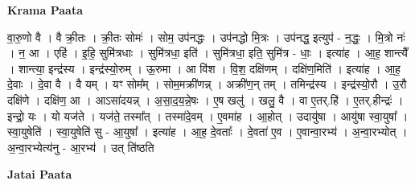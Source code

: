 \documentclass[17pt]{extarticle}
\begin{document}
\textbf{Krama Paata} \newline

वा॒रु॒णो वै । वै क्री॒तः । क्री॒तः सोमः॑ । सोम॒ उप॑नद्धः । उप॑नद्धो मि॒त्रः । उप॑नद्ध॒ इत्युप॑ - न॒द्धः॒ । मि॒त्रो नः॑ । न॒ आ । एहि॑ । इ॒हि॒ सुमि॑त्रधाः । सुमि॑त्रधा॒ इति॑ । सुमि॑त्रधा॒ इति॒ सुमि॑त्र - धाः॒ । इत्या॑ह । आ॒ह॒ शान्त्यै᳚ । शान्त्या॒ इन्द्र॑स्य । इन्द्र॑स्यो॒रुम् । ऊ॒रुमा । आ वि॑श । वि॒श॒ दक्षि॑णम् । दक्षि॑ण॒मिति॑ । इत्या॑ह । आ॒ह॒ दे॒वाः । दे॒वा वै । वै यम् । यꣳ सोम᳚म् । सोम॒मक्री॑णन्न् । अक्री॑ण॒न् तम् । तमिन्द्र॑स्य । इन्द्र॑स्यो॒रौ । उ॒रौ दक्षि॑णे । दक्षि॑ण॒ आ । आऽसा॑दयन्न् । अ॒सा॒द॒य॒न्ने॒षः । ए॒ष खलु॑ । खलु॒ वै । वा ए॒तर्.हि॑ । ए॒तर्.हीन्द्रः॑ । इन्द्रो॒ यः । यो यज॑ते । यज॑ते॒ तस्मा᳚त् । तस्मा॑दे॒वम् । ए॒वमा॑ह । आ॒होत् । उदायु॑षा । आयु॑षा स्वा॒युषा᳚ । स्वा॒युषेति॑ । स्वा॒युषेति॑ सु - आ॒युषा᳚ । इत्या॑ह । आ॒ह॒ दे॒वताः᳚ । दे॒वता॑ ए॒व । ए॒वान्वा॒रभ्य॑ । अ॒न्वा॒रभ्योत् । अ॒न्वा॒रभ्येत्य॑नु - आ॒रभ्य॑ । उत् ति॑ष्ठति \newline

\textbf{Jatai Paata} \newline
\end{document}
